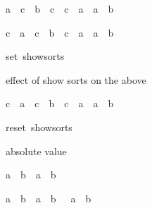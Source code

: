 \begin{isabellebody}
\begin{isamarkuptext}
\begin{isabelle}%
{\isacharparenleft}a\ {\isacharasterisk}\ c\ {\isacharequal}\ b\ {\isacharasterisk}\ c{\isacharparenright}\ {\isacharequal}\ {\isacharparenleft}c\ {\isacharequal}\ {\isacharparenleft}{}{\isasymColon}{\isacharprime}a{\isacharparenright}\ {\isasymor}\ a\ {\isacharequal}\ b{\isacharparenright}%
\end{isabelle}

\begin{isabelle}%
{\isacharparenleft}c\ {\isacharasterisk}\ a\ {\isacharequal}\ c\ {\isacharasterisk}\ b{\isacharparenright}\ {\isacharequal}\ {\isacharparenleft}c\ {\isacharequal}\ {\isacharparenleft}{}{\isasymColon}{\isacharprime}a{\isacharparenright}\ {\isasymor}\ a\ {\isacharequal}\ b{\isacharparenright}%
\end{isabelle}
%
\end{isamarkuptext}%
\isamarkuptrue%
%
\isadelimML
%
\endisadelimML
%
\isatagML
{}\isamarkupfalse%
{\isacharverbatimopen}set\ show{\isacharunderscore}sorts{\isacharverbatimclose}%
\endisatagML
{\isafoldML}%
%
\isadelimML
%
\endisadelimML
%
\begin{isamarkuptext}%
effect of show sorts on the above

\begin{isabelle}%
{\isacharparenleft}c\ {\isacharasterisk}\ a\ {\isacharequal}\ c\ {\isacharasterisk}\ b{\isacharparenright}\ {\isacharequal}\ {\isacharparenleft}c\ {\isacharequal}\ {\isacharparenleft}{}{\isasymColon}{\isacharprime}a{\isacharparenright}\ {\isasymor}\ a\ {\isacharequal}\ b{\isacharparenright}%
\end{isabelle}
%
\end{isamarkuptext}%
\isamarkuptrue%
%
\isadelimML
%
\endisadelimML
%
\isatagML
{}\isamarkupfalse%
{\isacharverbatimopen}reset\ show{\isacharunderscore}sorts{\isacharverbatimclose}%
\endisatagML
{\isafoldML}%
%
\isadelimML
%
\endisadelimML
%
\begin{isamarkuptext}%
absolute value

\begin{isabelle}%
{\isasymbar}a\ {\isacharasterisk}\ b{\isasymbar}\ {\isacharequal}\ {\isasymbar}a{\isasymbar}\ {\isacharasterisk}\ {\isasymbar}b{\isasymbar}%
\end{isabelle}

\begin{isabelle}%
{\isacharparenleft}{\isasymbar}a{\isasymbar}\ {\isasymle}\ b{\isacharparenright}\ {\isacharequal}\ {\isacharparenleft}a\ {\isasymle}\ b\ {\isasymand}\ {\isacharminus}\ a\ {\isasymle}\ b{\isacharparenright}%
\end{isabelle}


\end{isamarkuptext}
\end{isabellebody}
